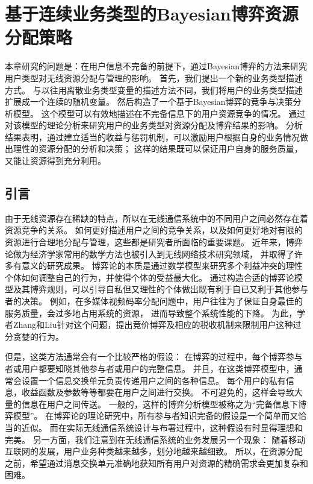 \graphicspath{ {../body/bayesian_figures/}}
\chapter{基于连续业务类型的Bayesian博弈资源分配策略}
\par 
本章研究的问题是：在用户信息不完备的前提下，通过Bayesian博弈的方法来研究用户类型对无线资源分配与管理的影响。
首先，我们提出一个新的业务类型描述方式。
与以往用离散业务类型变量的描述方法不同，我们将用户的业务类型描述扩展成一个连续的随机变量。
然后构造了一个基于Bayesian博弈的竞争与决策分析模型。
这个模型可以有效地描述在不完备信息下的用户资源竞争的情况。
通过对该模型的理论分析来研究用户的业务类型对资源分配及博弈结果的影响。
分析结果表明，通过建立适当的收益与惩罚机制，可以激励用户根据自身的业务情况做出理性的资源分配的分析和决策；
这样的结果既可以保证用户自身的服务质量，又能让资源得到充分利用。
%
\section{引言}
由于无线资源存在稀缺的特点，所以在无线通信系统中的不同用户之间必然存在着资源竞争的关系。
如何更好描述用户之间的竞争关系，以及如何更好地对有限的资源进行合理地分配与管理，这些都是研究者所面临的重要课题。
近年来，博弈论做为经济学家常用的数学方法也被引入到无线网络技术研究领域，
并取得了许多有意义的研究成果\cite{Srivastava:2005}\cite{FangBensaou2004}。
博弈论的本质是通过数学模型来研究多个利益冲突的理性个体如何调整自己的行为，并使得个体的受益最大化。
通过构造合适的博弈论模型及其博弈规则，可以引导自私但又理性的个体做出既有利于自已又利于其他参与者的决策。
例如，在多媒体视频码率分配问题中，用户往往为了保证自身最佳的服务质量，会过多地占用系统的资源，
进而导致整个系统性能的下降。
为此，学者Zhang和Liu针对这个问题，提出竞价博弈及相应的税收机制来限制用户这种过分贪婪的行为\cite{ZhangLiu2011}。

但是，这类方法通常会有一个比较严格的假设：
在博弈的过程中，每个博弈参与者或用户都要知晓其他参与者或用户的完整信息。
并且，在这类博弈模型中，通常会设置一个信息交换单元负责传递用户之间的各种信息。
每个用户的私有信息，收益函数及参数等等都要在用户之间进行交换。
不可避免的，这样会导致大量的信息在用户之间传送。
一般的，这样的博弈分析模型被称之为“完备信息下博弈模型”。
在博弈论的理论研究中，所有参与者知识完备的假设是一个简单而又恰当的近似。
而在实际无线通信系统设计与布署过程中，这种假设有时显得理想和完美。
另一方面，我们注意到在无线通信系统的业务发展另一个现象：
随着移动互联网的发展，用户业务种类越来越多，划分地越来越细致。
所以，在资源分配之前，希望通过消息交换单元准确地获知所有用户对资源的精确需求会更加复杂和困难。

